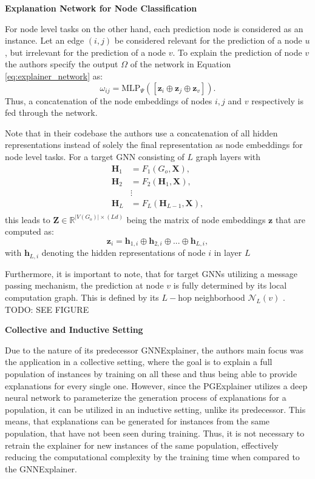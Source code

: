 \textbf{Explanation Network for Node Classification}\par
For node level tasks on the other hand, each prediction node is considered as an instance. Let an edge $(i,j)$ be considered relevant for the prediction of a node $u$, but irrelevant for the prediction of a node $v$. To explain the prediction of node $v$ the authors specify the output $\Omega$ of the network in Equation \ref{eq:explainer_network} as:
\begin{equation}
    \omega_{ij} = \text{MLP}_\Psi ([\mathbf{z}_i\oplus\mathbf{z}_j\oplus\mathbf{z}_v]).
\end{equation}
Thus, a concatenation of the node embeddings of nodes $i, j$ and $v$ respectively is fed through the network.

Note that in their codebase the authors use a concatenation of all hidden representations instead of solely the final representation as node embeddings for node level tasks.
For a target GNN consisting of $L$ graph layers with
\begin{align*}
    \mathbf{H}_1 &= F_1(G_o, \mathbf{X}), \\
    \mathbf{H}_2 &= F_2(\mathbf{H}_1, \mathbf{X}), \\
    &\vdots \\
    \mathbf{H}_L &= F_L(\mathbf{H}_{L-1}, \mathbf{X}), \\
\end{align*}
this leads to $\mathbf{Z} \in \mathbb{R}^{|V(G_o)|\times (Ld)}$ being the matrix of node embeddings $\mathbf{z}$ that are computed as:
\begin{equation}
    \mathbf{z}_i = \mathbf{h}_{1,i} \oplus \mathbf{h}_{2,i} \oplus ... \oplus \mathbf{h}_{L,i},
\end{equation}
with $\mathbf{h}_{L,i}$ denoting the hidden representations of node $i$ in layer $L$\bigskip

Furthermore, it is important to note, that for target GNNs utilizing a message passing mechanism, the prediction at node $v$ is fully determined by its local computation graph. This is defined by its $L-$hop neighborhood $\mathcal{N}_L(v)$ \cite{ying2019gnnexplainer}. TODO: SEE FIGURE\bigskip

\textbf{Collective and Inductive Setting}\par
Due to the nature of its predecessor GNNExplainer, the authors main focus was the application in a collective setting, where the goal is to explain a full population of instances by training on all these and thus being able to provide explanations for every single one. However, since the PGExplainer utilizes a deep neural network to parameterize the generation process of explanations for a population, it can be utilized in an inductive setting, unlike its predecessor. This means, that explanations can be generated for instances from the same population, that have not been seen during training. Thus, it is not necessary to retrain the explainer for new instances of the same population, effectively reducing the computational complexity by the training time when compared to the GNNExplainer.

